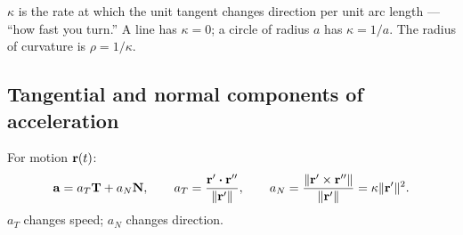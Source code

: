 \begin{intuition}
$\kappa$ is the rate at which the unit tangent changes direction per unit arc length ---
``how fast you turn.'' A line has $\kappa = 0$; a circle of radius $a$ has $\kappa = 1/a$.
The radius of curvature is $\rho = 1/\kappa$.
\end{intuition}

\subsection{Tangential and normal components of acceleration}
For motion $\mathbf{r}(t)$:
\[
\mathbf{a} = a_T \mathbf{T} + a_N \mathbf{N}, \qquad
a_T = \frac{\mathbf{r}'\boldsymbol\cdot \mathbf{r}''}{\lVert \mathbf{r}'\rVert}, \qquad
a_N = \frac{\lVert \mathbf{r}' \times \mathbf{r}''\rVert}{\lVert \mathbf{r}'\rVert} = \kappa \lVert \mathbf{r}'\rVert^2.
\]
$a_T$ changes speed; $a_N$ changes direction.
